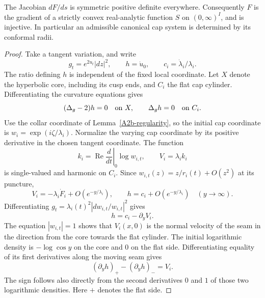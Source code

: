 \begin{theorem}
\label{A2b-energy}
The Jacobian $dF/ds$ is symmetric positive definite everywhere.
Consequently $F$ is the gradient of a strictly convex real-analytic
function $S$ on $(0,\infty)^I$, and is injective. In particular an
admissible canonical cap system is determined by its conformal radii.
\end{theorem}
\begin{proof}
Take a tangent variation, and write
\[
 g_t=e^{2u_t}|dz|^2,\qquad h=\dot u_0,\qquad
 c_i=\dot\lambda_i/\lambda_i.
\]
The ratio defining $h$ is independent of the fixed local coordinate.
Let $X$ denote the hyperbolic core, including its cusp ends, and $C_i$
the flat cap cylinder. Differentiating the curvature equations gives
\[
 (\Delta_g-2)h=0\quad\hbox{on }X,\qquad
 \Delta_g h=0\quad\hbox{on }C_i.
\]
Use the collar coordinate of Lemma~\ref{A2b-regularity}, so the initial
cap coordinate is $w_i=\exp(i\zeta/\lambda_i)$.
Normalize the varying cap coordinate by its positive derivative in the
chosen tangent coordinate. The function
\[
 k_i=\operatorname{Re}\left.\frac{d}{dt}\right|_0\log w_{i,t},
 \qquad V_i=\lambda_i k_i
\]
is single-valued and harmonic on $C_i$. Since
$w_{i,t}(z)=z/r_i(t)+O(z^2)$ at its puncture,
\[
 V_i=-\lambda_i\dot F_i+O(e^{-y/\lambda_i}),\qquad
 h=c_i+O(e^{-y/\lambda_i})\quad(y\longrightarrow\infty).
\]
Differentiating
$g_t=\lambda_i(t)^2|dw_{i,t}/w_{i,t}|^2$ gives
\begin{equation}\label{A2b-cap-variation}
 h=c_i-\partial_y V_i.
\end{equation}
The equation $|w_{i,t}|=1$ shows that $V_i(x,0)$ is the normal velocity
of the seam in the direction from the core towards the flat cylinder.
The initial logarithmic density is $-\log\cos y$ on the core and $0$
on the flat side. Differentiating equality of its first derivatives
along the moving seam gives
\begin{equation}\label{A2b-jump}
 (\partial_y h)_+-(\partial_y h)_-=V_i.
\end{equation}
The sign follows also directly from the second derivatives $0$ and $1$
of those two logarithmic densities. Here $+$ denotes the flat side.


\end{proof}
